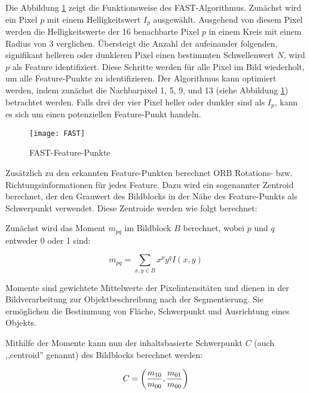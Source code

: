 Die Abbildung \ref{fig:FAST} zeigt die Funktionsweise des FAST-Algorithmus. Zunächst wird ein Pixel \( p \) mit einem Helligkeitswert \( I_p \) ausgewählt. Ausgehend von diesem Pixel werden die Helligkeitswerte der 16 benachbarte Pixel \( p \) in einem Kreis mit einem Radius von 3 verglichen. Übersteigt die Anzahl der aufeinander folgenden, signifikant helleren oder dunkleren Pixel einen bestimmten Schwellenwert \( N \), wird \( p \) als Feature identifiziert. Diese Schritte werden für alle Pixel im Bild wiederholt, um alle Feature-Punkte zu identifizieren. Der Algorithmus kann optimiert werden, indem zunächst die Nachbarpixel 1, 5, 9, und 13 (siehe Abbildung \ref{fig:FAST}) betrachtet werden. Falls drei der vier Pixel heller oder dunkler sind als \( I_p \), kann es sich um einen potenziellen Feature-Punkt handeln.

\begin{figure}
    \centering
    \texttt{[image: FAST]}
    \caption{FAST-Feature-Punkte\label{fig:FAST}}\par
\end{figure}

Zusätzlich zu den erkannten Feature-Punkten berechnet ORB Rotations- bzw. Richtungsinformationen für jedes Feature. Dazu wird ein sogenannter Zentroid berechnet, der den Grauwert des Bildblocks in der Nähe des Feature-Punkts als Schwerpunkt verwendet. Diese Zentroide werden wie folgt berechnet:

Zunächst wird das Moment \( m_{pq} \) im Bildblock \( B \) berechnet, wobei \( p \) und \( q \) entweder 0 oder 1 sind:

\begin{equation}
    m_{pq} = \sum_{x,y \in B} x^p y^q I(x, y)
\end{equation}

\begin{tcolorbox}[colback=THAi-Blue!20!white, colframe=THAi-Blue]
    Momente sind gewichtete Mittelwerte der Pixelintensitäten und dienen in der Bildverarbeitung zur Objektbeschreibung nach der Segmentierung. Sie ermöglichen die Bestimmung von Fläche, Schwerpunkt und Ausrichtung eines Objekts.
\end{tcolorbox}

Mithilfe der Momente kann nun der inhaltsbasierte Schwerpunkt \( C \) (auch ,,centroid'' genannt) des Bildblocks berechnet werden:

\begin{equation}
C = 
\left(
\frac{m_{10}}{m_{00}}, \\
\frac{m_{01}}{m_{00}}
\right)
\end{equation}

